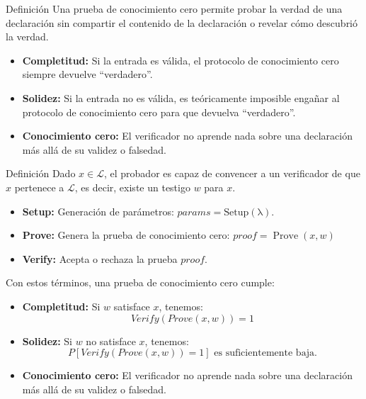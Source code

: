 \documentclass[8pt,xcolor=dvipsnames]{beamer}
\begin{document}

\begin{frame}[fragile]{Definición}
    Una prueba de conocimiento cero permite probar la verdad de una declaración sin compartir el contenido de la declaración o revelar cómo descubrió la verdad.
    \begin{itemize}
        \item \textbf{Completitud:} Si la entrada es válida, el protocolo de conocimiento cero siempre devuelve ``verdadero''.
        \item \textbf{Solidez:} Si la entrada no es válida, es teóricamente imposible engañar al protocolo de conocimiento cero para que devuelva ``verdadero''.
        \item \textbf{Conocimiento cero:} El verificador no aprende nada sobre una declaración más allá de su validez o falsedad.
    \end{itemize}
\end{frame}


\begin{frame}[fragile]{Definición}
    Dado $x \in \mathcal{L}$, el probador es capaz de convencer a un verificador de que $x$ pertenece a $\mathcal{L}$, es decir, existe un testigo $w$ para $x$.
    \begin{itemize}
        \item \textbf{Setup:} Generación de parámetros: $params = \operatorname{Setup(\lambda)}$.
        \item \textbf{Prove:} Genera la prueba de conocimiento cero: $proof = \operatorname{Prove}(x, w)$
        \item \textbf{Verify:} Acepta o rechaza la prueba $proof$.
    \end{itemize}

    Con estos términos, una prueba de conocimiento cero cumple:
    \begin{itemize}
        \item \textbf{Completitud:} Si $w$ satisface $x$, tenemos:
        $$Verify(Prove(x, w)) = 1$$
        \item \textbf{Solidez:} Si $w$ no satisface $x$, tenemos:
        $$P[Verify(Prove(x, w)) = 1] \text{ es suficientemente baja.}$$
        \item \textbf{Conocimiento cero:} El verificador no aprende nada sobre una declaración más allá de su validez o falsedad.
    \end{itemize}
\end{frame}
\end{document}
